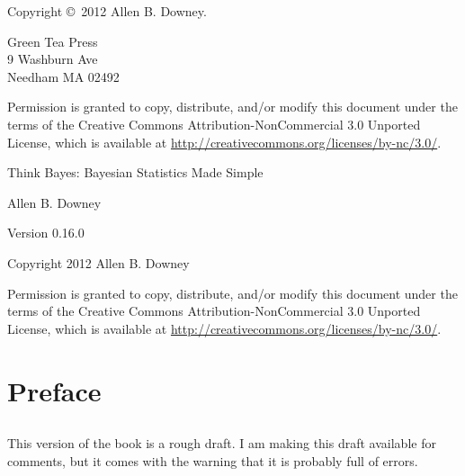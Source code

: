 \documentclass[12pt]{book}
\newcommand{\thetitle}{Think Bayes: Bayesian Statistics Made Simple}
\newcommand{\theversion}{0.16.0}
\begin{document}
\begin{latexonly}
Copyright \copyright ~2012 Allen B. Downey.


\vspace{0.2in}

\begin{flushleft}
Green Tea Press       \\
9 Washburn Ave \\
Needham MA 02492
\end{flushleft}

Permission is granted to copy, distribute, and/or modify this document
under the terms of the Creative Commons Attribution-NonCommercial 3.0 Unported
License, which is available at \url{http://creativecommons.org/licenses/by-nc/3.0/}.

\vspace{0.2in}

\end{latexonly}



\begin{htmlonly}


{\Large \thetitle}

{\large Allen B. Downey}

Version \theversion

\vspace{0.25in}

Copyright 2012 Allen B. Downey

\vspace{0.25in}

Permission is granted to copy, distribute, and/or modify this document
under the terms of the Creative Commons Attribution-NonCommercial 3.0
Unported License, which is available at
\url{http://creativecommons.org/licenses/by-nc/3.0/}.

\setcounter{chapter}{-1}

\end{htmlonly}

\fi

\chapter{Preface}
\label{preface}

\section*{}

This version of the book is a rough draft.  I am making this draft
available for comments, but it comes with the warning that it is
probably full of errors.
\end{document}
